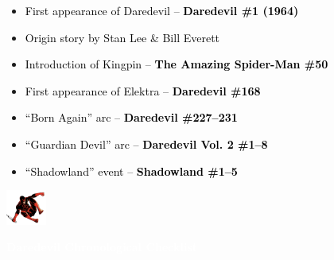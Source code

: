 \documentclass[12pt]{article}
\begin{document}
\begin{center}
\begin{tcolorbox}[
    colback=white!95!gray,
    colframe=black,
    width=0.9\textwidth,
    arc=4mm,
    auto outer arc,
    boxrule=0.8pt,
    left=8pt,right=8pt,top=8pt,bottom=8pt
]
\begin{itemize}[left=0pt]
    \item \textcolor{black}{First appearance of Daredevil – \textbf{Daredevil \#1 (1964)}}
    \item \textcolor{black}{Origin story by Stan Lee & Bill Everett}
    \item \textcolor{black}{Introduction of Kingpin – \textbf{The Amazing Spider-Man \#50}}
    \item \textcolor{black}{First appearance of Elektra – \textbf{Daredevil \#168}}
    \item \textcolor{black}{“Born Again” arc – \textbf{Daredevil \#227–231}}
    \item \textcolor{black}{“Guardian Devil” arc – \textbf{Daredevil Vol. 2 \#1–8}}
    \item \textcolor{black}{“Shadowland” event – \textbf{Shadowland \#1–5}}
\end{itemize}
\end{tcolorbox}
\end{center}

\newpage
{}

\begin{center}
    \vspace*{2cm}
    \includegraphics[width=0.1\textwidth]{daredevil1.png}
    \vspace{0.3cm}

    {\Huge \textbf{\textcolor{white}{Daredevil Chronological Checklist}}}
\end{center}
\end{document}
